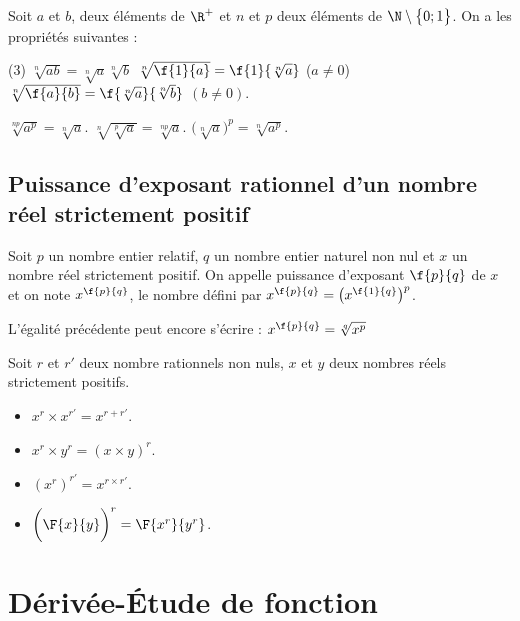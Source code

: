 \begin{propriete}[s]
Soit $a$ et $b$, deux éléments de $\R^+$ et $n$ et $p$ deux éléments de $\N\setminus\big\{0;1\big\}$. On a les propriétés suivantes :
\begin{tasks}[style=itemize](3)
	\task $\sqrt[n]{ab}=\sqrt[n]{a}\sqrt[n]{b}$
	\task $\sqrt[n]{\f{1}{a}}=\f{1}{\sqrt[n]{a}}$ ($a\neq 0$)
	\task $\sqrt[n]{\f{a}{b}}=\f{\sqrt[n]{a}}{\sqrt[n]{b}}$ $(b\neq 0)$.
	
	\task $\sqrt[np]{a^p}=\sqrt[n]{a}$.
	\task $\sqrt[n]{\sqrt[p]{a}}=\sqrt[np]{a}$.
	\task $\big(\sqrt[n]{a}\big)^p=\sqrt[n]{a^p}$.
\end{tasks}
\end{propriete}
\subsection{Puissance d'exposant rationnel d'un nombre réel strictement positif}
\begin{definition}
	Soit $p$ un nombre entier relatif, $q$ un nombre entier
	naturel non nul et $x$ un nombre réel strictement positif.
	On appelle puissance d’exposant $\f{p}{q}$ de $x$ et on note $x^\f{p}{q}$, le nombre défini par $x^\f{p}{q}=\big(x^\f{1}{q}\big)^p$.
	\par L'égalité précédente peut encore s'écrire : $x^\f{p}{q}=\sqrt[q]{x^p}$
\end{definition}
\hspace*{-0.8cm}
\begin{propriete}[s]
	Soit $r$ et $r'$ deux nombre rationnels non nuls, $x$ et $y$ deux nombres réels strictement positifs.
	\begin{itemize}
		\item $x^r\times x^{r'}=x^{r+r'}$.
		\item $x^r\times y^r=(x\times y)^r$.
		\item $(x^r)^{r'}=x^{r\times r'}$.
		\item $\bigg(\F{x}{y}\bigg)^r=\F{x^r}{y^r}$.
	\end{itemize}
\end{propriete}

\newpage
\section{Dérivée-Étude de fonction}
